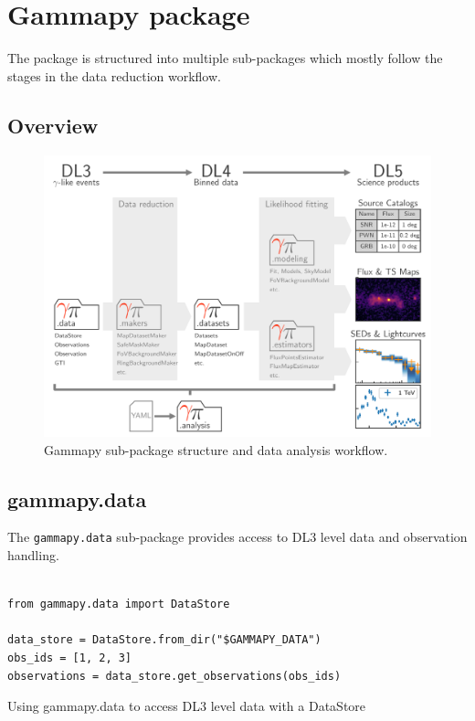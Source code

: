 \section{Gammapy package}
\label{sec:package}

The \gammapy package is structured into multiple sub-packages
which mostly follow the stages in the data reduction workflow.


\subsection{Overview}
\begin{figure}[t]
\centering
\includegraphics[width=1.\textwidth]{figures/data-flow-gammapy}
\caption{
Gammapy sub-package structure and data analysis workflow.
}
\label{fig:workflow}
\end{figure}



\subsection{gammapy.data}
The \verb|gammapy.data| sub-package provides access to
DL3 level data and observation handling.


\begin{listing}
\begin{verbatim}

from gammapy.data import DataStore

data_store = DataStore.from_dir("$GAMMAPY_DATA")
obs_ids = [1, 2, 3]
observations = data_store.get_observations(obs_ids)

\end{verbatim}
\caption{Using gammapy.data to access DL3 level data with a DataStore}
\label{codeexample:data}
\end{listing}



